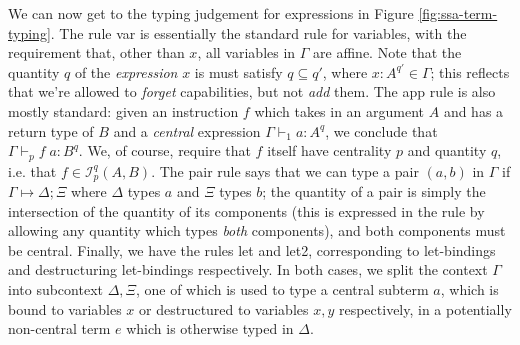\documentclass[acmsmall,screen,review]{acmart}
\newcommand{\mc}[1]{\ensuremath{\mathcal{#1}}}
\newcommand{\csplits}[3]{#1 \mapsto #2;#3}
\newcommand{\rle}[1]{{\scriptsize\textsf{#1}}}
\newcommand{\hasty}[5]{#1 \vdash_{#2} #3: {#4}^{#5}}
\begin{document}
We can now get to the typing judgement for expressions in Figure
\ref{fig:ssa-term-typing}. The rule \rle{var} is essentially the standard rule
for variables, with the requirement that, other than \(x\), all variables in
\(\Gamma\) are affine. Note that the quantity \(q\) of the \textit{expression}
\(x\) is must satisfy \(q \subseteq q'\), where \(x: A^{q'} \in \Gamma\); this
reflects that we're allowed to \textit{forget} capabilities, but not
\textit{add} them. The \rle{app} rule is also mostly standard: given an
instruction \(f\) which takes in an argument \(A\) and has a return type of
\(B\) and a \textit{central} expression \(\hasty{\Gamma}{1}{a}{A}{q}\), we
conclude that \(\hasty{\Gamma}{p}{f\;a}{B}{q}\). We, of course, require that
\(f\) itself have centrality \(p\) and quantity \(q\), i.e. that \(f \in
\mc{I}_p^q(A, B)\). The \rle{pair} rule says that we can type a pair \((a, b)\)
in \(\Gamma\) if \(\csplits{\Gamma}{\Delta}{\Xi}\) where \(\Delta\) types \(a\)
and \(\Xi\) types \(b\); the quantity of a pair is simply the intersection of
the quantity of its components (this is expressed in the rule by allowing any
quantity which types \textit{both} components), and both components must be
central. Finally, we have the rules \rle{let} and \rle{let2}, corresponding to
let-bindings and destructuring let-bindings respectively. In both cases, we
split the context \(\Gamma\) into subcontext \(\Delta, \Xi\), one of which is
used to type a central subterm \(a\), which is bound to variables \(x\) or
destructured to variables \(x, y\) respectively, in a potentially non-central
term \(e\) which is otherwise typed in \(\Delta\).
\end{document}
